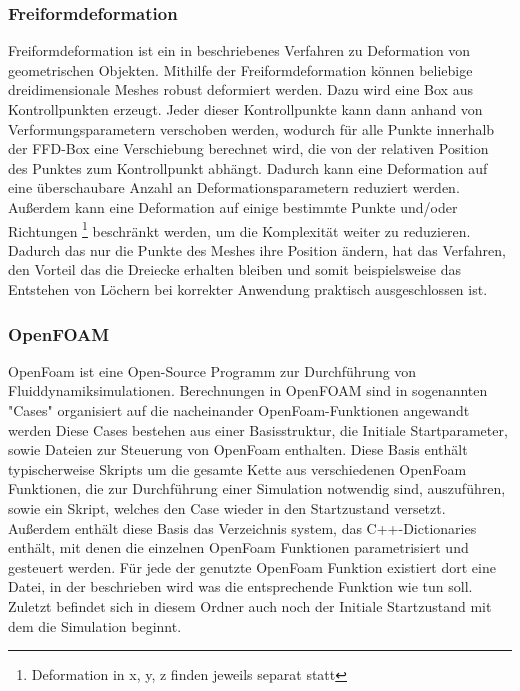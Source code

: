\subsubsection{Freiformdeformation}
\label{sub:ffd}
Freiformdeformation ist ein in \cite{Sederberg.1986} beschriebenes Verfahren zu Deformation von geometrischen Objekten.
Mithilfe der Freiformdeformation können beliebige dreidimensionale Meshes robust deformiert werden.
Dazu wird eine Box aus Kontrollpunkten erzeugt.
Jeder dieser Kontrollpunkte kann dann anhand von Verformungsparametern verschoben werden, wodurch für alle Punkte innerhalb der FFD-Box eine Verschiebung berechnet wird, die von der relativen Position des Punktes zum Kontrollpunkt abhängt.
Dadurch kann eine Deformation auf eine überschaubare Anzahl an Deformationsparametern reduziert werden.
Außerdem kann eine Deformation auf einige bestimmte Punkte und/oder Richtungen
\footnote{Deformation in x, y, z finden jeweils separat statt}
beschränkt werden, um die Komplexität weiter zu reduzieren.
Dadurch das nur die Punkte des Meshes ihre Position ändern, hat das Verfahren, den Vorteil das die Dreiecke erhalten bleiben und somit beispielsweise das Entstehen von Löchern bei korrekter Anwendung praktisch ausgeschlossen ist.

\subsubsection{OpenFOAM}
\label{sub:openfoam}
OpenFoam \cite{OpenCFD.} ist eine Open-Source Programm zur Durchführung von Fluiddynamiksimulationen.
Berechnungen in OpenFOAM sind in sogenannten "Cases" organisiert auf die nacheinander OpenFoam-Funktionen angewandt werden
Diese Cases bestehen aus einer Basisstruktur, die Initiale Startparameter, sowie Dateien zur Steuerung von OpenFoam enthalten.
Diese Basis enthält typischerweise Skripts um die gesamte Kette aus verschiedenen OpenFoam Funktionen, die zur Durchführung einer Simulation notwendig sind, auszuführen, sowie ein Skript, welches den Case wieder in den Startzustand versetzt.
Außerdem enthält diese Basis das Verzeichnis system, das C++-Dictionaries enthält, mit denen die einzelnen OpenFoam Funktionen parametrisiert und gesteuert werden.
Für jede der genutzte OpenFoam Funktion existiert dort eine Datei, in der beschrieben wird was die entsprechende Funktion wie tun soll. 
Zuletzt befindet sich in diesem Ordner auch noch der Initiale Startzustand mit dem die Simulation beginnt.

